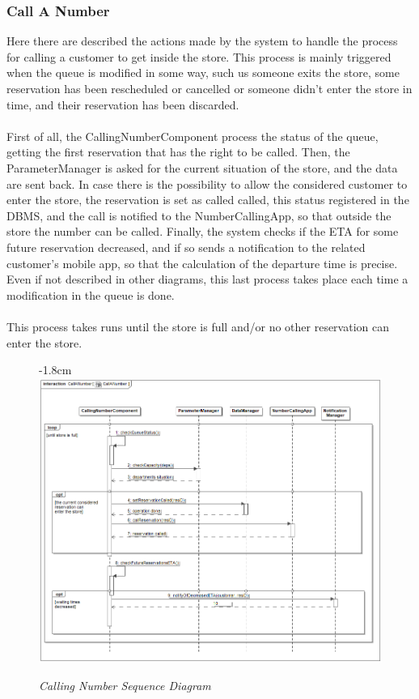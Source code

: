 \documentclass{article}
\begin{document}
	\subsubsection{Call A Number}
	Here there are described the actions made by the system to handle the process for calling a customer to get inside the store. This process is mainly triggered when the queue is modified in some way, such us someone exits the store, some reservation has been rescheduled or cancelled or someone didn't enter the store in time, and their reservation has been discarded. \\\\
	First of all, the CallingNumberComponent process the status of the queue, getting the first reservation that has the right to be called. Then, the ParameterManager is asked for the current situation of the store, and the data are sent back. In case there is the possibility to allow the considered customer to enter the store, the reservation is set as called called, this status registered in the DBMS, and the call is notified to the NumberCallingApp, so that outside the store the number can be called. Finally, the system checks if the ETA for some future reservation decreased, and if so sends a notification to the related customer's mobile app, so that the calculation of the departure time is precise. Even if not described in other diagrams, this last process takes place each time a modification in the queue is done.\\\\
	This process takes runs until the store is full and/or no other reservation can enter the store.

	\begin{figure}[H]
		\begin{adjustwidth} {-1.8cm}{}
			\centering
			\includegraphics[scale=0.5]{Sequence Diagrams/sd__CallANumber__CallANumber.png}
		\end{adjustwidth}
		\caption{\emph{Calling Number Sequence Diagram}}
	\end{figure}	
\end{document}
